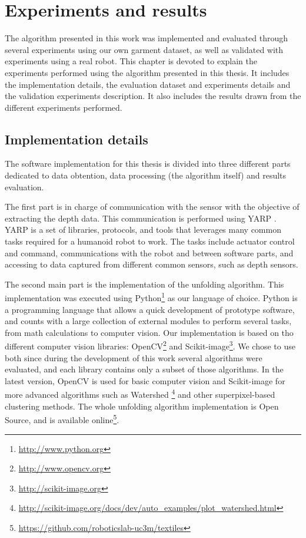\chapter{Experiments and results}
\label{experiments_and_results}

The algorithm presented in this work was implemented and evaluated through several experiments using our own garment dataset, as well as validated with experiments using a real robot. This chapter is devoted to explain the experiments performed using the algorithm presented in this thesis. It includes the implementation details, the evaluation dataset and experiments details and the validation experiments description. It also includes the results drawn from the different experiments performed.

\section{Implementation details}
\label{experiments:implementation}
The software implementation for this thesis is divided into three different parts dedicated to data obtention, data processing (the algorithm itself) and results evaluation. 

The first part is in charge of communication with the sensor with the objective of extracting the depth data. This communication is performed using YARP \cite{metta2006yarp}. YARP is a set of libraries, protocols, and tools that leverages many common tasks required for a humanoid robot to work. The tasks include actuator control and command, communications with the robot and between software parts, and accessing to data captured from different common sensors, such as depth sensors.

The second main part is the implementation of the unfolding algorithm. This implementation was executed using Python\footnote{\url{http://www.python.org}} as our language of choice. Python is a programming language that allows a quick development of prototype software, and counts with a large collection of external modules to perform several tasks, from math calculations to computer vision. Our implementation is based on tho different computer vision libraries: OpenCV\footnote{\url{http://www.opencv.org}} and Scikit-image\footnote{\url{http://scikit-image.org}}. We chose to use both since during the development of this work several algorithms were evaluated, and each library contains only a subset of those algorithms. In the latest version, OpenCV is used for basic computer vision and Scikit-image for more advanced algorithms such as Watershed \footnote{\url{http://scikit-image.org/docs/dev/auto_examples/plot_watershed.html}} and other superpixel-based clustering methods. The whole unfolding algorithm implementation is Open Source, and is available online\footnote{\url{https://github.com/roboticslab-uc3m/textiles}}.

